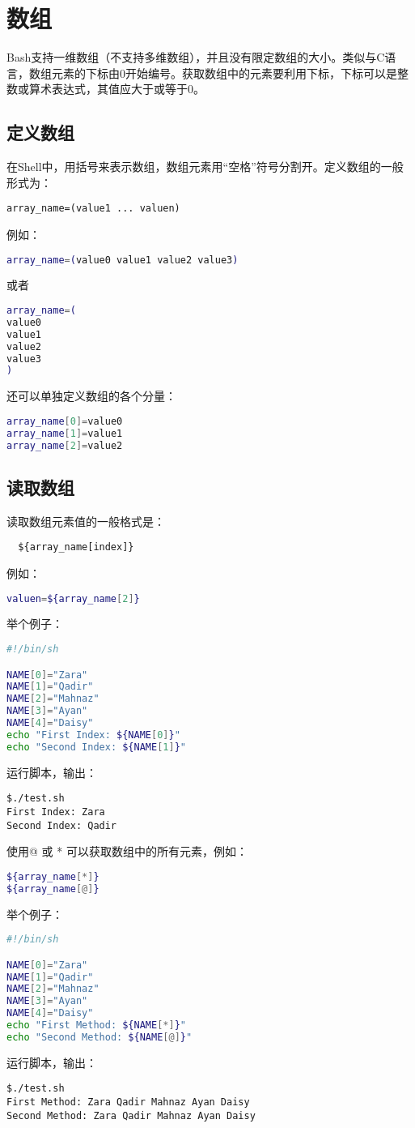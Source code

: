 \section{数组}
Bash支持一维数组（不支持多维数组），并且没有限定数组的大小。类似与C语言，数组元素的下标由0开始编号。获取数组中的元素要利用下标，下标可以是整数或算术表达式，其值应大于或等于0。


\subsection{定义数组}
在Shell中，用括号来表示数组，数组元素用“空格”符号分割开。定义数组的一般形式为：

\verb|array_name=(value1 ... valuen)|

例如：
\begin{lstlisting}[language=sh]
array_name=(value0 value1 value2 value3)
\end{lstlisting}
或者
\begin{lstlisting}[language=sh]
array_name=(
value0
value1
value2
value3
)
\end{lstlisting}

还可以单独定义数组的各个分量：
\begin{lstlisting}[language=sh]
array_name[0]=value0
array_name[1]=value1
array_name[2]=value2
\end{lstlisting}


\subsection{读取数组}
读取数组元素值的一般格式是：

\verb|  ${array_name[index]}|

例如：
\begin{lstlisting}[language=sh]
valuen=${array_name[2]}
\end{lstlisting}

举个例子：
\begin{lstlisting}[language=sh]
#!/bin/sh

NAME[0]="Zara"
NAME[1]="Qadir"
NAME[2]="Mahnaz"
NAME[3]="Ayan"
NAME[4]="Daisy"
echo "First Index: ${NAME[0]}"
echo "Second Index: ${NAME[1]}"
\end{lstlisting}
运行脚本，输出：
\begin{verbatim}
$./test.sh
First Index: Zara
Second Index: Qadir
\end{verbatim}
使用@ 或 * 可以获取数组中的所有元素，例如：
\begin{lstlisting}[language=sh]
${array_name[*]}
${array_name[@]}
\end{lstlisting}
举个例子：
\begin{lstlisting}[language=sh]
#!/bin/sh

NAME[0]="Zara"
NAME[1]="Qadir"
NAME[2]="Mahnaz"
NAME[3]="Ayan"
NAME[4]="Daisy"
echo "First Method: ${NAME[*]}"
echo "Second Method: ${NAME[@]}"
\end{lstlisting}
运行脚本，输出：
\begin{verbatim}
$./test.sh
First Method: Zara Qadir Mahnaz Ayan Daisy
Second Method: Zara Qadir Mahnaz Ayan Daisy
\end{verbatim}


